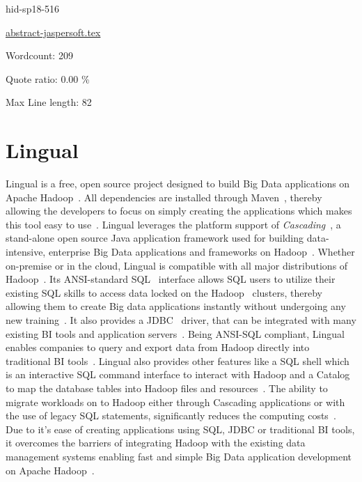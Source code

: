 \begin{IU}

hid-sp18-516

\href{https://github.com/cloudmesh-community/hid-sp18-516/blob/master//technology/abstract-jaspersoft.tex}{abstract-jaspersoft.tex}

 

Wordcount: 209


Quote ratio: 0.00 \%
 
Max Line length: 82
\end{IU}

\section{Lingual}

Lingual is a free, open source project designed to build Big Data applications
on Apache Hadoop~\cite{hid-sp18-516-www-drivenio-lingual}. All dependencies are
installed through Maven~\cite{hid-sp18-516-www-wiki-maven}, thereby allowing the 
developers to focus on simply creating the applications which makes this tool 
easy to use~\cite{hid-sp18-516-www-cascading}. Lingual leverages the platform 
support of \textit{Cascading}~\cite{hid-sp18-516-www-wiki-cascading}, a 
stand-alone open source Java application framework used for building 
data-intensive, enterprise Big Data applications and frameworks on 
Hadoop~\cite{hid-sp18-516-www-drivenio-lingual}. Whether on-premise or in the 
cloud, Lingual is compatible with all major distributions of 
Hadoop~\cite{hid-sp18-516-www-drivenio-lingual}. Its ANSI-standard 
SQL~\cite{hid-sp18-516-www-wiki-sql} interface allows SQL users to utilize 
their existing SQL skills to access data locked on the 
Hadoop~\cite{hid-sp18-516-www-wiki-hadoop} clusters, thereby allowing them 
to create Big data applications instantly without undergoing any new 
training~\cite{hid-sp18-516-www-drivenio-lingual}. It also provides a 
JDBC~\cite{hid-sp18-516-www-wiki-jdbc} driver, that can be integrated with many 
existing BI tools and application servers~\cite{hid-sp18-516-www-cascading}. 
Being ANSI-SQL compliant, Lingual enables companies to query and export data 
from Hadoop directly into traditional BI tools~\cite{hid-sp18-516-www-cascading}. 
Lingual also provides other features like a SQL shell which is an interactive 
SQL command interface to interact with Hadoop and a Catalog to map the database 
tables into Hadoop files and resources~\cite{hid-sp18-516-www-cascading}. The 
ability to migrate workloads on to Hadoop either through Cascading applications 
or with the use of legacy SQL statements, significantly reduces the computing
costs~\cite{hid-sp18-516-www-cascading}. Due to it's ease of creating
applications using SQL, JDBC or traditional BI tools, it overcomes the barriers
of integrating Hadoop with the existing data management systems enabling fast
and simple Big Data application development on Apache
Hadoop~\cite{hid-sp18-516-www-drivenio-lingual}.


